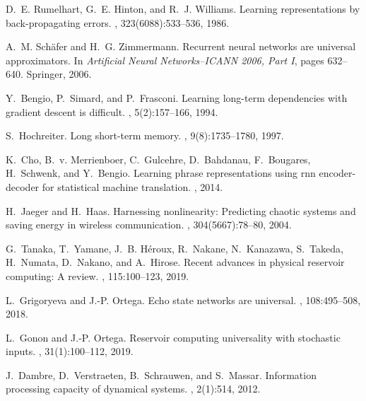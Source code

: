 \documentclass{article}
\begin{document}
\begin{thebibliography}{10}

D.~E. Rumelhart, G.~E. Hinton, and R.~J. Williams.
\newblock Learning representations by back-propagating errors.
, 323(6088):533--536, 1986.

A.~M. Sch{\"a}fer and H.~G. Zimmermann.
\newblock Recurrent neural networks are universal approximators.
\newblock In {\em Artificial Neural Networks--ICANN 2006, Part I}, pages
  632--640. Springer, 2006.

Y.~Bengio, P.~Simard, and P.~Frasconi.
\newblock Learning long-term dependencies with gradient descent is difficult.
, 5(2):157--166, 1994.

S.~Hochreiter.
\newblock Long short-term memory.
, 9(8):1735--1780, 1997.

K.~Cho, B.~v. Merrienboer, C.~Gulcehre, D.~Bahdanau, F.~Bougares, H.~Schwenk,
  and Y.~Bengio.
\newblock Learning phrase representations using rnn encoder-decoder for
  statistical machine translation.
, 2014.

H.~Jaeger and H.~Haas.
\newblock Harnessing nonlinearity: Predicting chaotic systems and saving energy
  in wireless communication.
, 304(5667):78--80, 2004.

G.~Tanaka, T.~Yamane, J.~B. H{\'e}roux, R.~Nakane, N.~Kanazawa, S.~Takeda,
  H.~Numata, D.~Nakano, and A.~Hirose.
\newblock Recent advances in physical reservoir computing: A review.
, 115:100--123, 2019.

L.~Grigoryeva and J.-P. Ortega.
\newblock Echo state networks are universal.
, 108:495--508, 2018.

L.~Gonon and J.-P. Ortega.
\newblock Reservoir computing universality with stochastic inputs.
,
  31(1):100--112, 2019.

J.~Dambre, D.~Verstraeten, B.~Schrauwen, and S.~Massar.
\newblock Information processing capacity of dynamical systems.
, 2(1):514, 2012.


\end{thebibliography}
\end{document}
